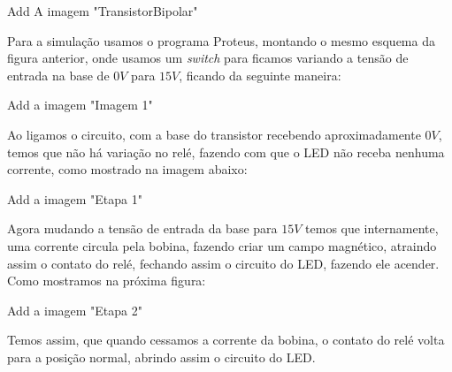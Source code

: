 	Add A imagem "TransistorBipolar"
	
Para a simulação usamos o programa Proteus, montando o mesmo esquema da figura anterior, onde usamos um \textit{switch}  para ficamos variando a tensão de entrada na base de $ 0 V $ para $ 15 V $, ficando da seguinte maneira:

	Add a imagem "Imagem 1"

Ao ligamos o circuito, com a base do transistor recebendo aproximadamente $ 0 V $, temos que não há variação no relé, fazendo com que o LED não receba nenhuma corrente, como mostrado na imagem abaixo:

	Add a imagem "Etapa 1"
	
Agora mudando a tensão de entrada da base para $ 15 V $ temos que internamente, uma corrente circula pela bobina, fazendo criar um campo magnético, atraindo assim o contato do relé, fechando assim o circuito do LED, fazendo ele acender. Como mostramos na próxima figura:

	Add a imagem "Etapa 2"
	
Temos assim, que quando cessamos a corrente da bobina, o contato do relé volta para a posição normal, abrindo assim o circuito do LED.
	
	

